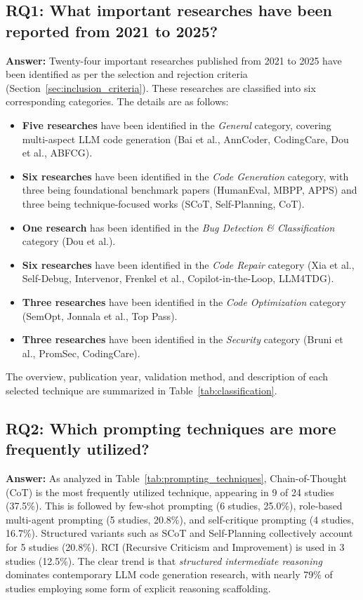 \documentclass[11pt,a4paper]{article}
\begin{document}
\subsection*{RQ1: What important researches have been reported from 2021 to 2025?}

\textbf{Answer:} Twenty-four important researches published from 2021 to 2025 have been identified as per the selection and rejection criteria (Section~\ref{sec:inclusion_criteria}). These researches are classified into six corresponding categories. The details are as follows:
\begin{itemize}[leftmargin=*]
\item \textbf{Five researches} have been identified in the \textit{General} category, covering multi-aspect LLM code generation (Bai et al., AnnCoder, CodingCare, Dou et al., ABFCG).
\item \textbf{Six researches} have been identified in the \textit{Code Generation} category, with three being foundational benchmark papers (HumanEval, MBPP, APPS) and three being technique-focused works (SCoT, Self-Planning, CoT).
\item \textbf{One research} has been identified in the \textit{Bug Detection \& Classification} category (Dou et al.).
\item \textbf{Six researches} have been identified in the \textit{Code Repair} category (Xia et al., Self-Debug, Intervenor, Frenkel et al., Copilot-in-the-Loop, LLM4TDG).
\item \textbf{Three researches} have been identified in the \textit{Code Optimization} category (SemOpt, Jonnala et al., Top Pass).
\item \textbf{Three researches} have been identified in the \textit{Security} category (Bruni et al., PromSec, CodingCare).
\end{itemize}
The overview, publication year, validation method, and description of each selected technique are summarized in Table~\ref{tab:classification}.

\subsection*{RQ2: Which prompting techniques are more frequently utilized?}

\textbf{Answer:} As analyzed in Table~\ref{tab:prompting_techniques}, Chain-of-Thought (CoT) is the most frequently utilized technique, appearing in 9 of 24 studies (37.5\%). This is followed by few-shot prompting (6 studies, 25.0\%), role-based multi-agent prompting (5 studies, 20.8\%), and self-critique prompting (4 studies, 16.7\%). Structured variants such as SCoT and Self-Planning collectively account for 5 studies (20.8\%). RCI (Recursive Criticism and Improvement) is used in 3 studies (12.5\%). The clear trend is that \textit{structured intermediate reasoning} dominates contemporary LLM code generation research, with nearly 79\% of studies employing some form of explicit reasoning scaffolding.
\end{document}

